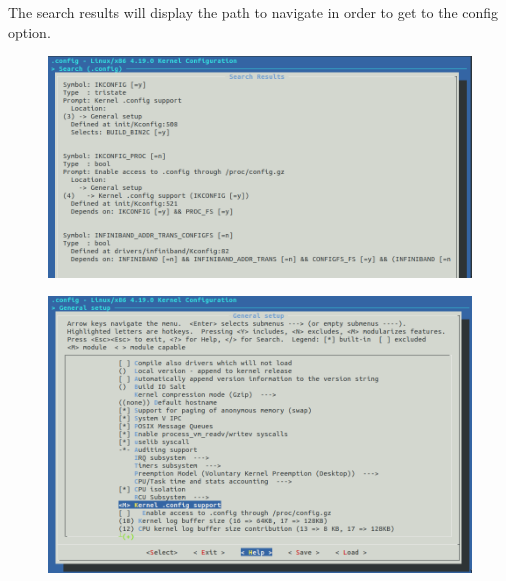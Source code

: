 \documentclass{beamer}
\begin{document}
\begin{frame}
  The search results will display the path to navigate in order to get to the
  config option.
  \begin{figure}[h!]
    \centering
    \includegraphics[scale=0.4]{images/proc-config-0-2.png}
  \end{figure}
\end{frame}

\begin{frame}
  \begin{figure}[h!]
    \centering
    \includegraphics[scale=0.3]{images/proc-config-1.png}
  \end{figure}
\end{frame}
\end{document}
